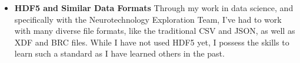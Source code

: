\begin{itemize}
    \item \textbf{HDF5 and Similar Data Formats} Through my work in
    data science, and specifically with the Neurotechnology Exploration 
    Team, I've had to work with many diverse file formats, like the 
    traditional CSV and JSON, as well as XDF and BRC files. While 
    I have not used HDF5 yet, I possess the skills to learn such a 
    standard as I have learned others in the past.

\end{itemize}